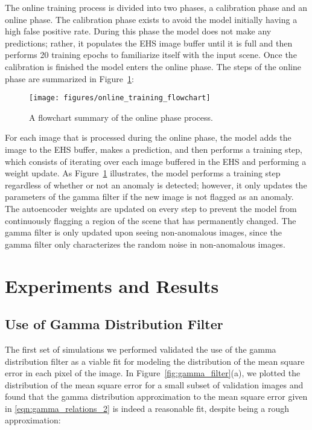 \documentclass[12pt]{article}
\begin{document}
The online training process is divided into two phases, a calibration phase and an online phase. The calibration phase exists to avoid the model initially having a high false positive rate. During this phase the model does not make any predictions; rather, it populates the EHS image buffer until it is full and then performs 20 training epochs to familiarize itself with the input scene. Once the calibration is finished the model enters the online phase. The steps of the online phase are summarized in Figure~\ref{fig:online_learning}:

\begin{figure}[H]
\begin{center}
\texttt{[image: figures/online\_training\_flowchart]}
\end{center}
\caption{A flowchart summary of the online phase process.}
\label{fig:online_learning}
\end{figure}

For each image that is processed during the online phase, the model adds the image to the EHS buffer, makes a prediction, and then performs a training step, which consists of iterating over each image buffered in the EHS and performing a weight update. As Figure~\ref{fig:online_learning} illustrates, the model performs a training step regardless of whether or not an anomaly is detected; however, it only updates the parameters of the gamma filter if the new image is not flagged as an anomaly. The autoencoder weights are updated on every step to prevent the model from continuously flagging a region of the scene that has permanently changed. The gamma filter is only updated upon seeing non-anomalous images, since the gamma filter only characterizes the random noise in non-anomalous images.\\




\section{Experiments and Results}

\subsection{Use of Gamma Distribution Filter}

The first set of simulations we performed validated the use of the gamma distribution filter as a viable fit for modeling the distribution of the mean square error in each pixel of the image. In Figure~\ref{fig:gamma_filter}(a), we plotted the distribution of the mean square error for a small subset of validation images and found that the gamma distribution approximation to the mean square error given in \eqref{eqn:gamma_relations_2} is indeed a reasonable fit, despite being a rough approximation:
\end{document}
